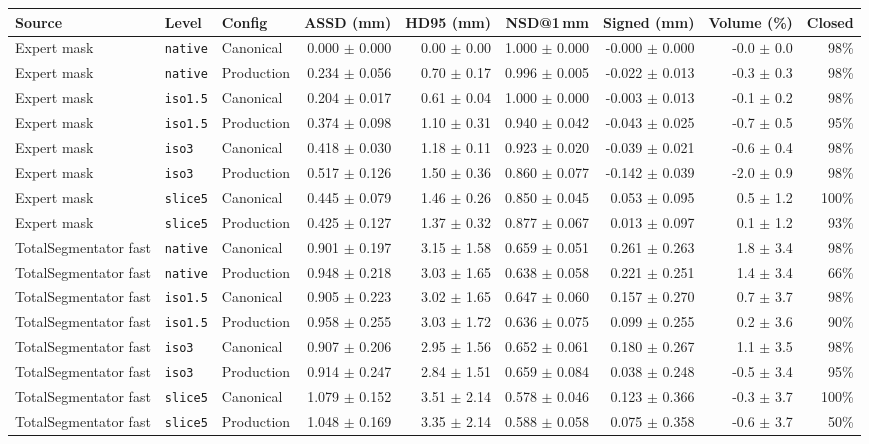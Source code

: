 \begin{tabular}{lllrrrrrr}
\toprule
Source & Level & Config & ASSD (mm) & HD95 (mm) & NSD@1\,mm & Signed (mm) & Volume (\%) & Closed \\
\midrule
Expert mask & \texttt{native} & Canonical & 0.000 $\pm$ 0.000 & 0.00 $\pm$ 0.00 & 1.000 $\pm$ 0.000 & -0.000 $\pm$ 0.000 & -0.0 $\pm$ 0.0 & 98\% \\
Expert mask & \texttt{native} & Production & 0.234 $\pm$ 0.056 & 0.70 $\pm$ 0.17 & 0.996 $\pm$ 0.005 & -0.022 $\pm$ 0.013 & -0.3 $\pm$ 0.3 & 98\% \\
Expert mask & \texttt{iso1.5} & Canonical & 0.204 $\pm$ 0.017 & 0.61 $\pm$ 0.04 & 1.000 $\pm$ 0.000 & -0.003 $\pm$ 0.013 & -0.1 $\pm$ 0.2 & 98\% \\
Expert mask & \texttt{iso1.5} & Production & 0.374 $\pm$ 0.098 & 1.10 $\pm$ 0.31 & 0.940 $\pm$ 0.042 & -0.043 $\pm$ 0.025 & -0.7 $\pm$ 0.5 & 95\% \\
Expert mask & \texttt{iso3} & Canonical & 0.418 $\pm$ 0.030 & 1.18 $\pm$ 0.11 & 0.923 $\pm$ 0.020 & -0.039 $\pm$ 0.021 & -0.6 $\pm$ 0.4 & 98\% \\
Expert mask & \texttt{iso3} & Production & 0.517 $\pm$ 0.126 & 1.50 $\pm$ 0.36 & 0.860 $\pm$ 0.077 & -0.142 $\pm$ 0.039 & -2.0 $\pm$ 0.9 & 98\% \\
Expert mask & \texttt{slice5} & Canonical & 0.445 $\pm$ 0.079 & 1.46 $\pm$ 0.26 & 0.850 $\pm$ 0.045 & 0.053 $\pm$ 0.095 & 0.5 $\pm$ 1.2 & 100\% \\
Expert mask & \texttt{slice5} & Production & 0.425 $\pm$ 0.127 & 1.37 $\pm$ 0.32 & 0.877 $\pm$ 0.067 & 0.013 $\pm$ 0.097 & 0.1 $\pm$ 1.2 & 93\% \\
\midrule
TotalSegmentator fast & \texttt{native} & Canonical & 0.901 $\pm$ 0.197 & 3.15 $\pm$ 1.58 & 0.659 $\pm$ 0.051 & 0.261 $\pm$ 0.263 & 1.8 $\pm$ 3.4 & 98\% \\
TotalSegmentator fast & \texttt{native} & Production & 0.948 $\pm$ 0.218 & 3.03 $\pm$ 1.65 & 0.638 $\pm$ 0.058 & 0.221 $\pm$ 0.251 & 1.4 $\pm$ 3.4 & 66\% \\
TotalSegmentator fast & \texttt{iso1.5} & Canonical & 0.905 $\pm$ 0.223 & 3.02 $\pm$ 1.65 & 0.647 $\pm$ 0.060 & 0.157 $\pm$ 0.270 & 0.7 $\pm$ 3.7 & 98\% \\
TotalSegmentator fast & \texttt{iso1.5} & Production & 0.958 $\pm$ 0.255 & 3.03 $\pm$ 1.72 & 0.636 $\pm$ 0.075 & 0.099 $\pm$ 0.255 & 0.2 $\pm$ 3.6 & 90\% \\
TotalSegmentator fast & \texttt{iso3} & Canonical & 0.907 $\pm$ 0.206 & 2.95 $\pm$ 1.56 & 0.652 $\pm$ 0.061 & 0.180 $\pm$ 0.267 & 1.1 $\pm$ 3.5 & 98\% \\
TotalSegmentator fast & \texttt{iso3} & Production & 0.914 $\pm$ 0.247 & 2.84 $\pm$ 1.51 & 0.659 $\pm$ 0.084 & 0.038 $\pm$ 0.248 & -0.5 $\pm$ 3.4 & 95\% \\
TotalSegmentator fast & \texttt{slice5} & Canonical & 1.079 $\pm$ 0.152 & 3.51 $\pm$ 2.14 & 0.578 $\pm$ 0.046 & 0.123 $\pm$ 0.366 & -0.3 $\pm$ 3.7 & 100\% \\
TotalSegmentator fast & \texttt{slice5} & Production & 1.048 $\pm$ 0.169 & 3.35 $\pm$ 2.14 & 0.588 $\pm$ 0.058 & 0.075 $\pm$ 0.358 & -0.6 $\pm$ 3.7 & 50\% \\
\bottomrule
\end{tabular}
